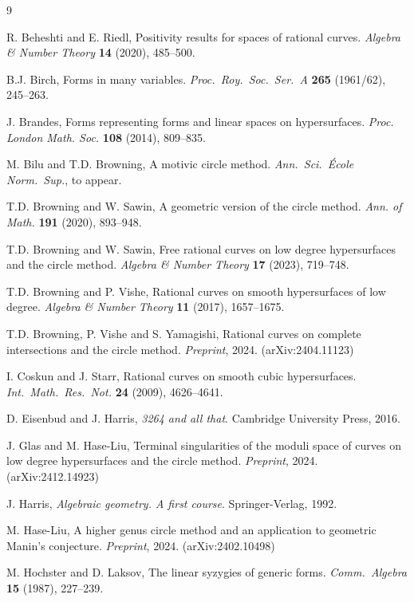 \documentclass[12pt, reqno]{amsart}
\numberwithin{equation}{section}
\newcommand{\0}{\mathbf{0}}
\renewcommand{\=}{\equiv}
\newcommand{\1}{\mathbf{1}}
\theoremstyle{definition}
\begin{document}
\begin{thebibliography}{9}

R. Beheshti and E. Riedl, Positivity results for spaces of rational curves. {\em Algebra
\& Number Theory} {\bf 14} (2020), 485--500.



B.J. Birch,
Forms in many variables.
{\em Proc.\ Roy.\ Soc.\ Ser.\ A} {\bf 265} (1961/62), 245--263.

 J. Brandes, Forms representing forms and linear spaces on hypersurfaces. {\em Proc. London Math. Soc.} {\bf 108} (2014), 809--835.

M. Bilu and 
T.D. Browning, 
A motivic circle method.
{\em Ann.\ Sci.\ \'Ecole Norm.\ Sup.}, to appear.


 T.D. Browning and W. Sawin,
A geometric version of the circle method. {\em Ann. of Math.}
{\bf 191} (2020), 893--948.

T.D. Browning and W. Sawin,
Free rational curves on low degree hypersurfaces and the circle method.
{\em Algebra \& Number Theory} {\bf 17} (2023), 719--748.

T.D. Browning and P. Vishe,
Rational curves on smooth hypersurfaces of low degree.
{\em Algebra \& Number Theory} {\bf 11} (2017), 1657--1675.


 T.D. Browning, P. Vishe and S. Yamagishi,
Rational curves on complete intersections and the circle method.
{\em Preprint}, 2024. (arXiv:2404.11123)


I. Coskun and J. Starr,
Rational curves on smooth cubic hypersurfaces.
{\em Int.\ Math.\ Res.\ Not.}  {\bf 24} (2009), 4626--4641.

 D. Eisenbud and J. Harris, {\em 3264 and all that}. 
Cambridge University Press, 2016.

J. Glas and  M. Hase-Liu,
Terminal singularities of the moduli space of curves on low degree hypersurfaces and the circle method. {\em Preprint}, 2024. (arXiv:2412.14923)

 J. Harris, {\em Algebraic geometry. A first course}. Springer-Verlag, 1992.

M. Hase-Liu,
A higher genus circle method and an application to geometric Manin's conjecture.
{\em Preprint}, 2024. (arXiv:2402.10498)

M. Hochster and D. Laksov, The linear syzygies of generic forms. {\em Comm.\ Algebra} {\bf 15} (1987), 227--239.





\end{thebibliography}
\end{document}
